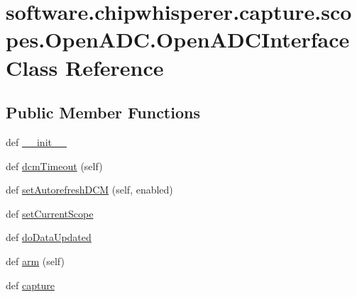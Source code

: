 \hypertarget{classsoftware_1_1chipwhisperer_1_1capture_1_1scopes_1_1OpenADC_1_1OpenADCInterface}{}\section{software.\+chipwhisperer.\+capture.\+scopes.\+Open\+A\+D\+C.\+Open\+A\+D\+C\+Interface Class Reference}
\label{classsoftware_1_1chipwhisperer_1_1capture_1_1scopes_1_1OpenADC_1_1OpenADCInterface}
\subsection*{Public Member Functions}
\begin{DoxyCompactItemize}
\item 
def \hyperlink{classsoftware_1_1chipwhisperer_1_1capture_1_1scopes_1_1OpenADC_1_1OpenADCInterface_a7a2784adc847de64730434cc71c2a29f}{\+\_\+\+\_\+init\+\_\+\+\_\+}
\item 
def \hyperlink{classsoftware_1_1chipwhisperer_1_1capture_1_1scopes_1_1OpenADC_1_1OpenADCInterface_af990fb6ab50d14597afbdceb147e1e37}{dcm\+Timeout} (self)
\item 
def \hyperlink{classsoftware_1_1chipwhisperer_1_1capture_1_1scopes_1_1OpenADC_1_1OpenADCInterface_acb0fba5072f58e18d3468f5545b916ec}{set\+Autorefresh\+D\+C\+M} (self, enabled)
\item 
def \hyperlink{classsoftware_1_1chipwhisperer_1_1capture_1_1scopes_1_1OpenADC_1_1OpenADCInterface_aad146d0b4b4800954e28fdbe6281c514}{set\+Current\+Scope}
\item 
def \hyperlink{classsoftware_1_1chipwhisperer_1_1capture_1_1scopes_1_1OpenADC_1_1OpenADCInterface_ad5daa8d9b7a02ff13b5bb3e23fffc22b}{do\+Data\+Updated}
\item 
def \hyperlink{classsoftware_1_1chipwhisperer_1_1capture_1_1scopes_1_1OpenADC_1_1OpenADCInterface_a01b804b243cd6f713343c7072cd3c256}{arm} (self)
\item 
def \hyperlink{classsoftware_1_1chipwhisperer_1_1capture_1_1scopes_1_1OpenADC_1_1OpenADCInterface_acc98eafa098f7518167f5e236381d0e3}{capture}
\end{DoxyCompactItemize}
